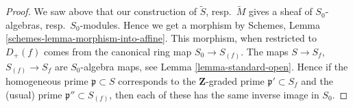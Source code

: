 \documentclass{stacks-project}
\theoremstyle{plain}
\theoremstyle{definition}
\theoremstyle{remark}
\numberwithin{equation}{subsection}
\begin{document}
\begin{proof}
We saw above that our construction of $\widetilde S$,
resp.\ $\widetilde M$ gives a sheaf of $S_0$-algebras, resp.\ $S_0$-modules.
Hence we get a morphism by
Schemes, Lemma \ref{schemes-lemma-morphism-into-affine}.
This morphism, when restricted to $D_{+}(f)$ comes from the
canonical ring map $S_0 \to S_{(f)}$. The maps
$S \to S_f$, $S_{(f)} \to S_f$ are $S_0$-algebra maps, see
Lemma \ref{lemma-standard-open}.
Hence if the homogeneous prime $\mathfrak p \subset S$
corresponds to the $\mathbf{Z}$-graded prime $\mathfrak p' \subset S_f$
and the (usual) prime $\mathfrak p'' \subset S_{(f)}$, then
each of these has the same inverse image in $S_0$.
\end{proof}
\end{document}
